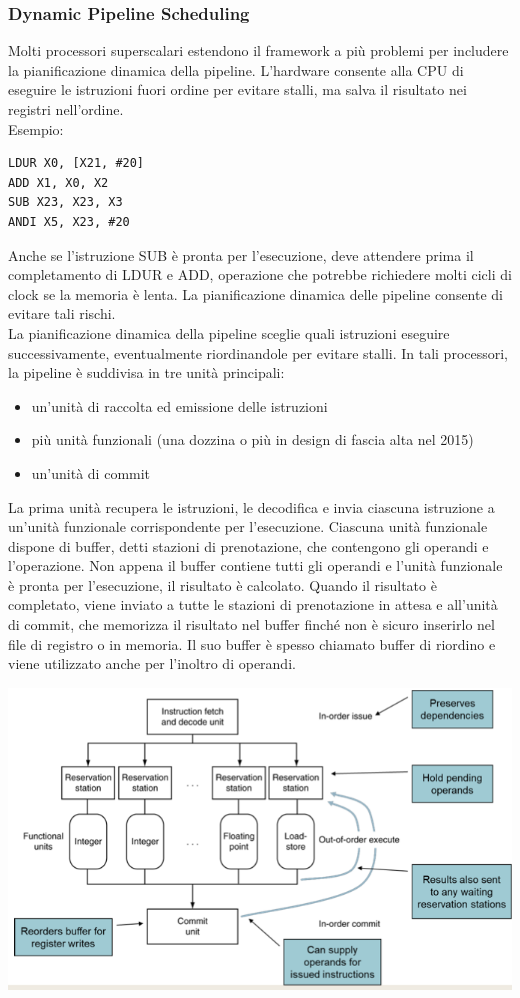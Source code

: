 \documentclass[12pt,a4paper]{article}
\begin{document}
\subsubsection{Dynamic Pipeline Scheduling}
Molti processori superscalari estendono il framework a più problemi per includere la pianificazione dinamica della pipeline. L'hardware consente alla CPU di eseguire le istruzioni fuori ordine per evitare stalli, ma salva il risultato nei registri nell'ordine.\\
Esempio:
\begin{verbatim}
LDUR X0, [X21, #20]
ADD X1, X0, X2
SUB X23, X23, X3
ANDI X5, X23, #20
\end{verbatim}
Anche se l'istruzione SUB è pronta per l'esecuzione, deve attendere prima il completamento di LDUR e ADD, operazione che potrebbe richiedere molti cicli di clock se la memoria è lenta. La pianificazione dinamica delle pipeline consente di evitare tali rischi.\\
La pianificazione dinamica della pipeline sceglie quali istruzioni eseguire successivamente, eventualmente riordinandole per evitare stalli. In tali processori, la pipeline è suddivisa in tre unità principali:
\begin{itemize}
\item un'unità di raccolta ed emissione delle istruzioni
\item più unità funzionali (una dozzina o più in design di fascia alta nel 2015)
\item un'unità di commit
\end{itemize}
La prima unità recupera le istruzioni, le decodifica e invia ciascuna istruzione a un'unità funzionale corrispondente per l'esecuzione. Ciascuna unità funzionale dispone di buffer, detti stazioni di prenotazione, che contengono gli operandi e l'operazione. Non appena il buffer contiene tutti gli operandi e l'unità funzionale è pronta per l'esecuzione, il risultato è
calcolato. Quando il risultato è completato, viene inviato a tutte le stazioni di prenotazione in attesa e all'unità di commit,
che memorizza il risultato nel buffer finché non è sicuro inserirlo nel file di registro o in memoria. Il suo buffer è spesso chiamato buffer di riordino e viene utilizzato anche per l'inoltro di operandi.
\begin{center}
\includegraphics[width=0.6\columnwidth]{img/dynamic_schedule.png}
\end{center}
\end{document}

